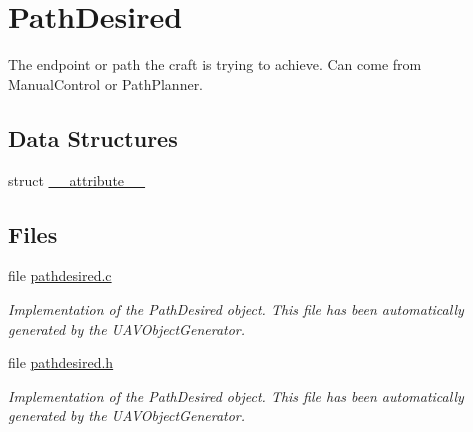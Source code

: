 \hypertarget{group___path_desired}{\section{\-Path\-Desired}
\label{group___path_desired}
}


\-The endpoint or path the craft is trying to achieve. \-Can come from \-Manual\-Control or \-Path\-Planner.  


\subsection*{\-Data \-Structures}
\begin{DoxyCompactItemize}
\item 
struct \hyperlink{struct____attribute____}{\-\_\-\-\_\-attribute\-\_\-\-\_\-}
\end{DoxyCompactItemize}
\subsection*{\-Files}
\begin{DoxyCompactItemize}
\item 
file \hyperlink{pathdesired_8c}{pathdesired.\-c}
\begin{DoxyCompactList}\small\item\em \-Implementation of the \-Path\-Desired object. \-This file has been automatically generated by the \-U\-A\-V\-Object\-Generator. \end{DoxyCompactList}\item 
file \hyperlink{pathdesired_8h}{pathdesired.\-h}
\begin{DoxyCompactList}\small\item\em \-Implementation of the \-Path\-Desired object. \-This file has been automatically generated by the \-U\-A\-V\-Object\-Generator. \end{DoxyCompactList}\end{DoxyCompactItemize}
